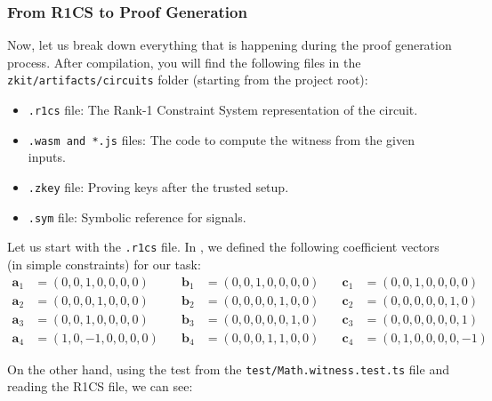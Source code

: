 \documentclass[../lecture-notes.tex]{subfiles}
\begin{document}
    \subsubsection{From R1CS to Proof Generation}

    Now, let us break down everything that is happening during the proof
    generation process. After compilation, you will find the following files in
    the \texttt{zkit/artifacts/circuits} folder (starting from the project
    root):
    \begin{itemize}
        \item \texttt{.r1cs} file: The Rank-1 Constraint System representation of the circuit.
        \item \texttt{.wasm and *.js} files: The code to compute the witness from the given inputs.
        \item \texttt{.zkey} file: Proving keys after the trusted setup.
        \item \texttt{.sym} file: Symbolic reference for signals.
    \end{itemize}

    Let us start with the \texttt{.r1cs} file. In ,
    we defined the following coefficient vectors (in simple constraints) for our
    task:
    \begin{align*}
        \mathbf{a}_1 &= (0, 0, 1, 0, 0, 0, 0) & \quad \mathbf{b}_1 &= (0, 0, 1, 0, 0, 0, 0) & \quad \mathbf{c}_1 &= (0, 0, 1, 0, 0, 0, 0) \\
        \mathbf{a}_2 &= (0, 0, 0, 1, 0, 0, 0) & \quad \mathbf{b}_2 &= (0, 0, 0, 0, 1, 0, 0) & \quad \mathbf{c}_2 &= (0, 0, 0, 0, 0, 1, 0) \\
        \mathbf{a}_3 &= (0, 0, 1, 0, 0, 0, 0) & \quad \mathbf{b}_3 &= (0, 0, 0, 0, 0, 1, 0) & \quad \mathbf{c}_3 &= (0, 0, 0, 0, 0, 0, 1) \\
        \mathbf{a}_4 &= (1, 0, -1, 0, 0, 0, 0) & \quad \mathbf{b}_4 &= (0, 0, 0, 1, 1, 0, 0) & \quad \mathbf{c}_4 &= (0, 1, 0, 0, 0, 0, -1)
    \end{align*}

    On the other hand, using the test from the \texttt{test/Math.witness.test.ts} file and reading the R1CS file, we can see:
\end{document}

